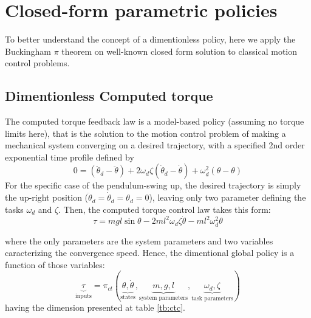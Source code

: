 \newpage
\section{Closed-form parametric policies}

To better understand the concept of a dimentionless policy, here we apply the Buckingham $\pi$ theorem on well-known closed form solution to classical motion control problems.

\subsection{Dimentionless Computed torque}

The computed torque feedback law is a model-based policy (assuming no torque limits here), that is the solution to the motion control problem of making a mechanical system converging on a desired trajectory, with a specified 2nd order exponential time profile defined by
\begin{equation}
0 = (\ddot{\theta}_d - \ddot{\theta})+ 2 \omega_d \zeta (\dot{\theta}_d - \dot{\theta}) + \omega_d^2 (\theta - \theta)
\end{equation}
For the specific case of the pendulum-swing up, the desired trajectory is simply the up-right position ($\ddot{\theta}_d = \dot{\theta}_d = \theta_d = 0$), leaving only two parameter defining the tasks $\omega_d$ and $\zeta$. Then, the computed torque control law takes this form:
\begin{equation}
\tau = mgl \sin \theta - 2 m l^2 \omega_d \zeta \dot{\theta} - m l^2 \omega_d^2 \theta
\label{eq:ct}
\end{equation}

where the only parameters are the system parameters and two variables caracterizing the convergence speed. Hence, the dimentional global policy is a function of those variables:
\begin{equation}
\underbrace{\tau}_{\text{inputs}}
=
\pi_{ct} \left(
\underbrace{ \theta, \dot{\theta} }_{\text{states}},
\underbrace{ m , g , l }_{\text{system parameters}},
\underbrace{ \omega_d , \zeta }_{\text{task parameters}}
\right)
\label{tb:ctc}
\end{equation}
having the dimension presented at table \ref{tb:ctc}.

